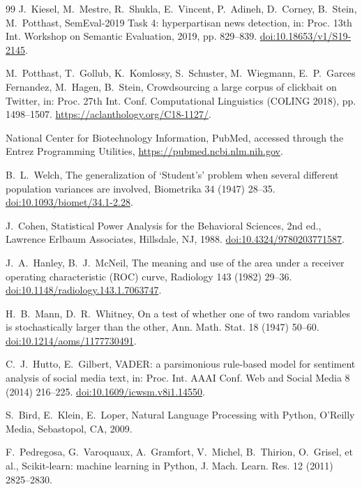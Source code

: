 \documentclass[preprint,12pt]{elsarticle}
\begin{document}
\begin{thebibliography}{99}
J.~Kiesel, M.~Mestre, R.~Shukla, E.~Vincent, P.~Adineh, D.~Corney, B.~Stein, M.~Potthast,
SemEval-2019 Task 4: hyperpartisan news detection,
in: Proc. 13th Int. Workshop on Semantic Evaluation, 2019, pp. 829--839.
\href{https://doi.org/10.18653/v1/S19-2145}{doi:10.18653/v1/S19-2145}.

M.~Potthast, T.~Gollub, K.~Komlossy, S.~Schuster, M.~Wiegmann, E.~P.~Garces Fernandez,
M.~Hagen, B.~Stein,
Crowdsourcing a large corpus of clickbait on Twitter,
in: Proc. 27th Int. Conf. Computational Linguistics (COLING 2018), pp. 1498--1507.
\url{https://aclanthology.org/C18-1127/}.

National Center for Biotechnology Information, PubMed, accessed through the Entrez
Programming Utilities, \url{https://pubmed.ncbi.nlm.nih.gov}.

B.~L.~Welch,
The generalization of `Student's' problem when several different population variances are
involved,
Biometrika 34 (1947) 28--35.
\href{https://doi.org/10.1093/biomet/34.1-2.28}{doi:10.1093/biomet/34.1-2.28}.

J.~Cohen,
Statistical Power Analysis for the Behavioral Sciences, 2nd ed.,
Lawrence Erlbaum Associates, Hillsdale, NJ, 1988.
\href{https://doi.org/10.4324/9780203771587}{doi:10.4324/9780203771587}.

J.~A.~Hanley, B.~J.~McNeil,
The meaning and use of the area under a receiver operating characteristic (ROC) curve,
Radiology 143 (1982) 29--36.
\href{https://doi.org/10.1148/radiology.143.1.7063747}{doi:10.1148/radiology.143.1.7063747}.

H.~B.~Mann, D.~R.~Whitney,
On a test of whether one of two random variables is stochastically larger than the other,
Ann. Math. Stat. 18 (1947) 50--60.
\href{https://doi.org/10.1214/aoms/1177730491}{doi:10.1214/aoms/1177730491}.

C.~J.~Hutto, E.~Gilbert,
VADER: a parsimonious rule-based model for sentiment analysis of social media text,
in: Proc. Int. AAAI Conf. Web and Social Media 8 (2014) 216--225.
\href{https://doi.org/10.1609/icwsm.v8i1.14550}{doi:10.1609/icwsm.v8i1.14550}.

S.~Bird, E.~Klein, E.~Loper,
Natural Language Processing with Python,
O'Reilly Media, Sebastopol, CA, 2009.

F.~Pedregosa, G.~Varoquaux, A.~Gramfort, V.~Michel, B.~Thirion, O.~Grisel, et al.,
Scikit-learn: machine learning in Python,
J. Mach. Learn. Res. 12 (2011) 2825--2830.


\end{thebibliography}
\end{document}
